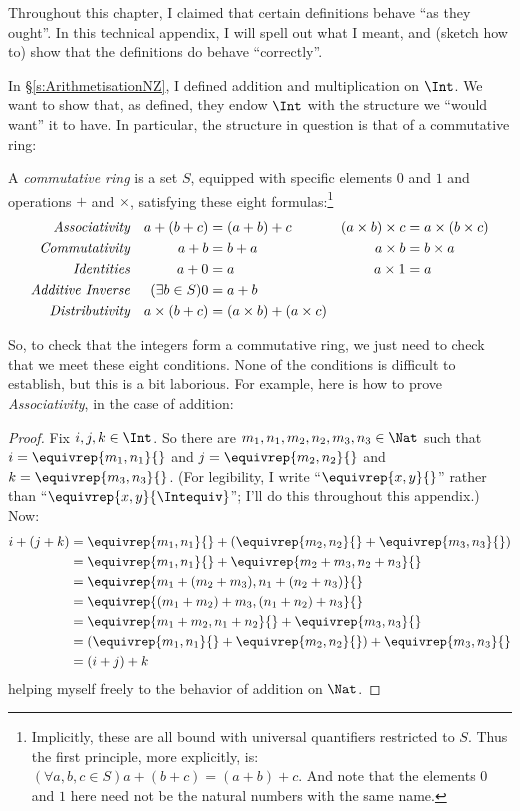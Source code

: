 \documentclass[../../../include/open-logic-section]{subfiles}
\begin{document}
	

Throughout this chapter, I claimed that certain definitions behave ``as they ought''. In this technical appendix, I will spell out what I meant, and (sketch how to) show that the definitions do behave ``correctly''. 

In \S\ref{s:ArithmetisationNZ}, I defined addition and multiplication on $\Int$. We want to show that, as defined, they endow $\Int$ with the structure we ``would want'' it to have. In particular, the structure in question is that of a commutative ring:
\begin{defn}
	A \emph{commutative ring} is a set $S$, equipped with specific elements $0$ and $1$ and operations $+$ and $\times$, satisfying these eight formulas:\footnote{Implicitly, these are all bound with universal quantifiers restricted to $S$. Thus the first principle, more explicitly, is: $(\forall a, b, c \in S)a + (b+c) = (a+b)+c$. And note that the elements $0$ and $1$ here need not be the natural numbers with the same name.}
	\begin{align*}
		\emph{Associativity}&&a + (b+ c) & = (a + b) + c & (a \times b) \times c & = a \times (b\times c)\\
		\emph{Commutativity}&&a + b &= b+ a  &  a \times b&= b\times a\\ 
		\emph{Identities}&&a + 0 &= a & a \times 1 &= a\\
		\emph{Additive Inverse}&&(\exists b\in S)0&=a + b\\
		\emph{Distributivity}&&a \times (b+ c ) &= (a \times b) + (a \times c)
	\end{align*}
\end{defn}\noindent 
So, to check that the integers form a commutative ring, we just need to check that we meet these eight conditions. None of the conditions is {difficult} to establish, but this is a bit laborious. For example, here is how to prove \emph{Associativity}, in the case of addition:
\begin{proof} 
	Fix $i, j, k \in \Int$. So there are $m_1, n_1, m_2, n_2, m_3, n_3 \in \Nat$ such that $i = \equivrep{m_1, n_1}{}$ and $j = \equivrep{m_2,n_2}{}$ and $k = \equivrep{m_3, n_3}{}$. (For legibility, I write ``$\equivrep{x, y}{}$'' rather than ``$\equivrep{x, y}{\Intequiv}$''; I'll do this throughout this appendix.) Now:
\begin{align*}
	i + (j + k) &= \equivrep{m_1, n_1}{}+(\equivrep{m_2, n_2}{} + \equivrep{m_3, n_3}{}) \\
	&= \equivrep{m_1,  n_1}{} + \equivrep{m_2+m_3, n_2+n_3}{}\\
	&= \equivrep{m_1 + (m_2 + m_3), n_1 + (n_2 + n_3)}{}\\
	&= \equivrep{(m_1 + m_2) + m_3, (n_1 + n_2) + n_3}{}\\
	&= \equivrep{m_1 + m_2, n_1 + n_2}{} + \equivrep{m_3, n_3}{}\\
	&= (\equivrep{m_1, n_1}{} + \equivrep{m_2, n_2}{}) + \equivrep{m_3, n_3}{}\\
	&= (i+j) + k
\end{align*}
helping myself freely to the behavior of addition on $\Nat$.
\end{proof}\noindent
\end{document}
